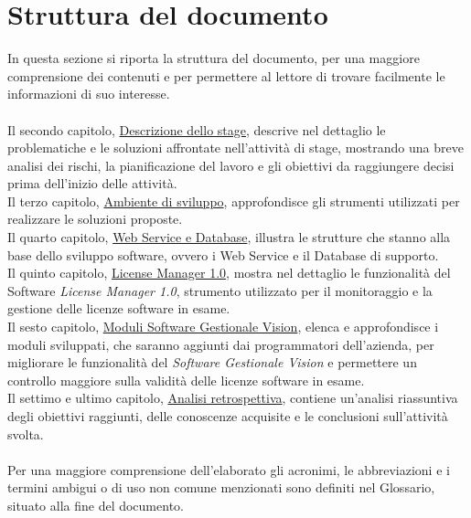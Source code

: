 \section{Struttura del documento}

In questa sezione si riporta la struttura del documento, per una maggiore comprensione dei contenuti e per permettere al lettore di trovare facilmente le informazioni di suo interesse.
\\
\\
Il secondo capitolo, {\hyperref[cap:descrizione-stage]{Descrizione dello stage}}, descrive nel dettaglio le problematiche e le soluzioni affrontate nell'attività di stage, mostrando una breve analisi dei rischi, la pianificazione del lavoro e gli obiettivi da raggiungere decisi prima dell'inizio delle attività.
\\
Il terzo capitolo, {\hyperref[cap:ambiente-sviluppo]{Ambiente di sviluppo}}, approfondisce gli strumenti utilizzati per realizzare le soluzioni proposte.
\\ 
Il quarto capitolo, {\hyperref[cap:sviluppo-software]{Web Service e Database}}, illustra le strutture che stanno alla base dello sviluppo software, ovvero i Web Service e il Database di supporto.
\\ 
Il quinto capitolo, {\hyperref[cap:license-manager]{License Manager 1.0}}, mostra nel dettaglio le funzionalità del Software \textit{License Manager 1.0}, strumento utilizzato per il monitoraggio e la gestione delle licenze software in esame.
\\
Il sesto capitolo, {\hyperref[cap:moduli-vision]{Moduli Software Gestionale Vision}}, elenca e approfondisce i moduli sviluppati, che saranno aggiunti dai programmatori dell'azienda, per migliorare le funzionalità del \textit{Software Gestionale Vision} e permettere un controllo maggiore sulla validità delle licenze software in esame.
\\  
Il settimo e ultimo capitolo, {\hyperref[cap:analisi-retrospettiva]{Analisi retrospettiva}}, contiene un'analisi riassuntiva degli obiettivi raggiunti, delle conoscenze acquisite e le conclusioni sull'attività svolta.
\\
\\
Per una maggiore comprensione dell'elaborato gli acronimi, le abbreviazioni e i termini ambigui o di uso non comune menzionati sono definiti nel Glossario, situato alla fine del documento.


